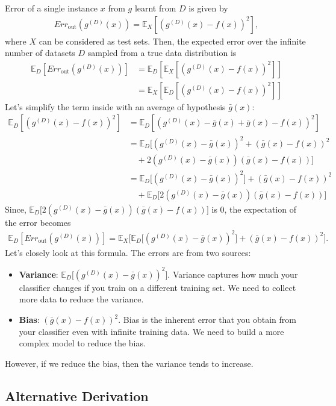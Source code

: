 Error of a single instance $x$ from $g$ learnt from $D$ is given by
\begin{align*}
	Err_{\textrm{out}}(g^{(D)}(x)) = \mathbb{E}_{X}[(g^{(D)}(x)-f(x))^2],
\end{align*}
where $X$ can be considered as test sets. Then, the expected error over the infinite number of datasets $D$ sampled from a true data distribution is
\begin{align*}
	\mathbb{E}_D[Err_{\textrm{out}}(g^{(D)}(x))] &= \mathbb{E}_D[\mathbb{E}_{X}[(g^{(D)}(x)-f(x))^2]]\\
												 &= \mathbb{E}_X[\mathbb{E}_D[(g^{(D)}(x)-f(x))^2]]
\end{align*}
Let's simplify the term inside with an average of hypothesis $\bar{g}(x)$:
\begin{align*}
	\mathbb{E}_D[(g^{(D)}(x)-f(x))^2]&= \mathbb{E}_D[(g^{(D)}(x)-\bar{g}(x)+\bar{g}(x)-f(x))^2]\\
	&= \mathbb{E}_D\big[(g^{(D)}(x)-\bar{g}(x))^2+(\bar{g}(x)-f(x))^2\\ &\quad + 2 (g^{(D)}(x)-\bar{g}(x))(\bar{g}(x)-f(x))\big]\\
	&= \mathbb{E}_D\big[(g^{(D)}(x)-\bar{g}(x))^2\big]+(\bar{g}(x)-f(x))^2\\ &\quad + \mathbb{E}_D\big[2 (g^{(D)}(x)-\bar{g}(x))(\bar{g}(x)-f(x))\big]
\end{align*}
Since, $\mathbb{E}_D\big[2 (g^{(D)}(x)-\bar{g}(x))(\bar{g}(x)-f(x))\big]$ is 0, the expectation of the error becomes
\begin{align*}
	\mathbb{E}_D[Err_{\textrm{out}}(g^{(D)}(x))] = \mathbb{E}_X\big[\mathbb{E}_D\big[(g^{(D)}(x)-\bar{g}(x))^2\big]+(\bar{g}(x)-f(x))^2\big].
\end{align*}
Let's closely look at this formula. The errors are from two sources:
\begin{itemize}
	\item \textbf{Variance}: $\mathbb{E}_D\big[(g^{(D)}(x)-\bar{g}(x))^2\big]$. Variance captures how much your classifier changes if you train on a different training set. We need to collect more data to reduce the variance. 
	\item \textbf{Bias}: $(\bar{g}(x)-f(x))^2$. Bias is the inherent error that you obtain from your classifier even with infinite training data. We need to build a more complex model to reduce the bias. 
\end{itemize}
However, if we reduce the bias, then the variance tends to increase. 

\subsection{Alternative Derivation}


